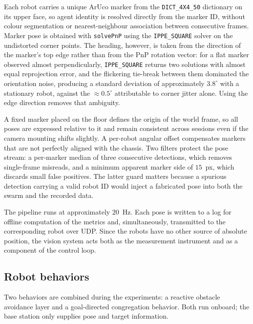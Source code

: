 \documentclass[conference]{IEEEtran}
\begin{document}
Each robot carries a unique ArUco marker from the \texttt{DICT\_4X4\_50}
dictionary on its upper face, so agent identity is resolved directly from the
marker ID, without colour segmentation or nearest-neighbour association between
consecutive frames. Marker pose is obtained with \texttt{solvePnP} using the
\texttt{IPPE\_SQUARE} solver on the undistorted corner points. The heading,
however, is taken from the direction of the marker's top edge rather than from
the PnP rotation vector: for a flat marker observed almost perpendicularly,
\texttt{IPPE\_SQUARE} returns two solutions with almost equal reprojection
error, and the flickering tie-break between them dominated the orientation
noise, producing a standard deviation of approximately $3.8^\circ$ with a
stationary robot, against the $\approx 0.5^\circ$ attributable to corner jitter
alone. Using the edge direction removes that ambiguity.

A fixed marker placed on the floor defines the origin of the world frame, so all
poses are expressed relative to it and remain consistent across sessions even if
the camera mounting shifts slightly. A per-robot angular offset compensates
markers that are not perfectly aligned with the chassis. Two filters protect the
pose stream: a per-marker median of three consecutive detections, which removes
single-frame misreads, and a minimum apparent marker side of $15$~px, which
discards small false positives. The latter guard matters because a spurious
detection carrying a valid robot ID would inject a fabricated pose into both the
swarm and the recorded data.

The pipeline runs at approximately $20$~Hz. Each pose is written to a log for
offline computation of the metrics and, simultaneously, transmitted to the
corresponding robot over UDP. Since the robots have no other source of absolute
position, the vision system acts both as the measurement instrument and as a
component of the control loop.

\subsection{Robot behaviors}

Two behaviors are combined during the experiments: a reactive obstacle avoidance
layer and a goal-directed congregation behavior. Both run onboard; the base
station only supplies pose and target information.
\end{document}

